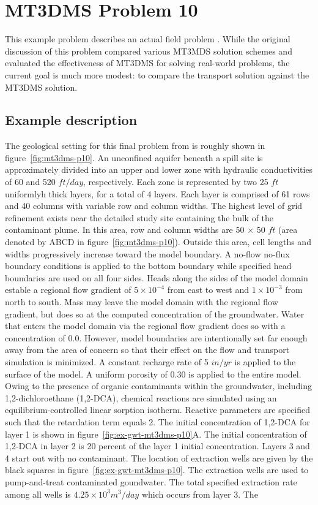 \section{MT3DMS Problem 10}

This example problem describes an actual field problem \citep{zheng1999mt3dms}.  While the original discussion of this problem compared various MT3MDS solution schemes and evaluated the effectiveness of MT3DMS for solving real-world problems, the current goal is much more modest: to compare the \mf transport solution against the MT3DMS solution.  

\subsection{Example description}

The geological setting for this final problem from \cite{zheng1999mt3dms} is roughly shown in figure~\ref{fig:mt3dms-p10}.  An unconfined aquifer beneath a spill site is approximately divided into an upper and lower zone with hydraulic conductivities of 60 and 520 $ft/day$, respectively.  Each zone is represented by two 25 $ft$ uniformlyh thick layers, for a total of 4 layers.  Each layer is comprised of 61 rows and 40 columns with variable row and column widths.  The highest level of grid refinement exists near the detailed study site containing the bulk of the contaminant plume.  In this area, row and column widths are 50 $\times$ 50 $ft$ (area denoted by ABCD in figure~\ref{fig:mt3dms-p10}). Outside this area, cell lengths and widths progressively increase toward the model boundary.  A no-flow no-flux boundary conditions is applied to the bottom boundary while specified head boundaries are used on all four sides.  Heads along the sides of the model domain estable a regional flow gradient of $5 \times 10^{-4}$ from east to west and $1 \times 10^{-3}$ from north to south.  Mass may leave the model domain with the regional flow gradient, but does so at the computed concentration of the groundwater. Water that enters the model domain via the regional flow gradient does so with a concentration of 0.0.  However, model boundaries are intentionally set far enough away from the area of concern so that their effect on the flow and transport simulation is minimized.  A constant recharge rate of 5 $in/yr$ is applied to the surface of the model.  A uniform porosity of 0.30 is applied to the entire model.  Owing to the presence of organic contaminants within the groundwater, including 1,2-dichloroethane (1,2-DCA), chemical reactions are simulated using an equilibrium-controlled linear sorption isotherm.  Reactive parameters are specified such that the retardation term equals 2.  The initial concentration of 1,2-DCA for layer 1 is shown in figure~\ref{fig:ex-gwt-mt3dms-p10}A. The initial concentration of 1,2-DCA in layer 2 is 20 percent of the layer 1 initial concentration.  Layers 3 and 4 start out with no contaminant.  The location of extraction wells are given by the black squares in figure~\ref{fig:ex-gwt-mt3dms-p10}. The extraction wells are used to pump-and-treat contaminated goundwater.  The total specified extraction rate among all wells is $4.25 \times 10^3 m^3/day$ which occurs from layer 3. The 